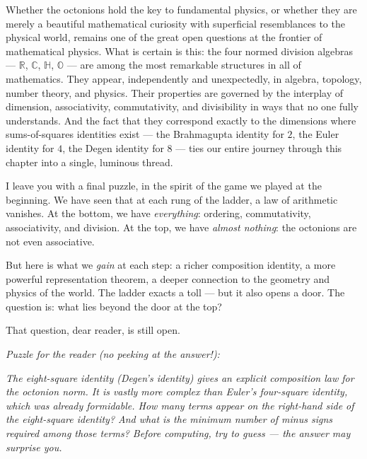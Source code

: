 Whether the octonions hold the key to fundamental physics, or whether they are merely a beautiful mathematical curiosity with superficial resemblances to the physical world, remains one of the great open questions at the frontier of mathematical physics. What is certain is this: the four normed division algebras --- $\mathbb{R}$, $\mathbb{C}$, $\mathbb{H}$, $\mathbb{O}$ --- are among the most remarkable structures in all of mathematics. They appear, independently and unexpectedly, in algebra, topology, number theory, and physics. Their properties are governed by the interplay of dimension, associativity, commutativity, and divisibility in ways that no one fully understands. And the fact that they correspond exactly to the dimensions where sums-of-squares identities exist --- the Brahmagupta identity for $2$, the Euler identity for $4$, the Degen identity for $8$ --- ties our entire journey through this chapter into a single, luminous thread.

I leave you with a final puzzle, in the spirit of the game we played at the beginning. We have seen that at each rung of the ladder, a law of arithmetic vanishes. At the bottom, we have \textit{everything}: ordering, commutativity, associativity, and division. At the top, we have \textit{almost nothing}: the octonions are not even associative.

But here is what we \textit{gain} at each step: a richer composition identity, a more powerful representation theorem, a deeper connection to the geometry and physics of the world. The ladder exacts a toll --- but it also opens a door. The question is: what lies beyond the door at the top?

That question, dear reader, is still open.

\bigskip

\textit{Puzzle for the reader (no peeking at the answer!):}


\begin{displayquote}
\textit{The eight-square identity (Degen's identity) gives an explicit composition law for the octonion norm. It is vastly more complex than Euler's four-square identity, which was already formidable. How many terms appear on the right-hand side of the eight-square identity? And what is the minimum number of minus signs required among those terms? Before computing, try to guess --- the answer may surprise you.}
\end{displayquote}

